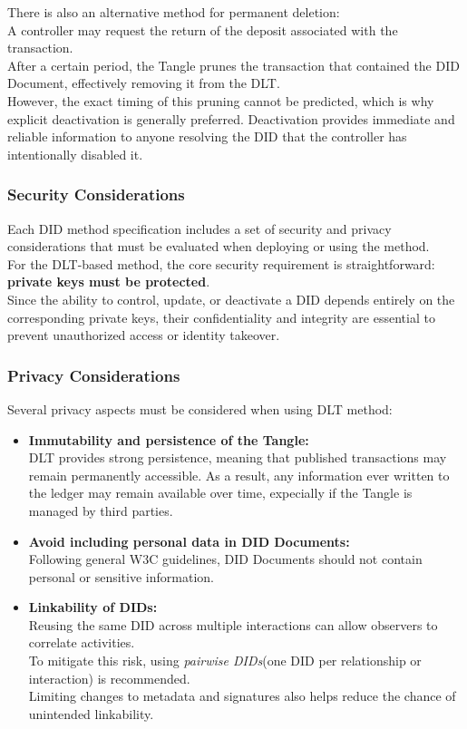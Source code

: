 \noindent
There is also an alternative method for permanent deletion: \\
A controller may request the return of the deposit associated with the transaction. \\
After a certain period, the Tangle prunes the transaction that contained the DID Document, effectively removing it from the DLT. \\
However, the exact timing of this pruning cannot be predicted, which is why explicit deactivation is generally preferred. Deactivation provides immediate and reliable information to anyone resolving the DID that the controller has intentionally disabled it.

\subsubsection *{Security Considerations}
Each DID method specification includes a set of security and privacy considerations that must be evaluated when deploying or using the method.\\ 
For the DLT-based method, the core security requirement is straightforward: \textbf{private keys must be protected}.\\
Since the ability to control, update, or deactivate a DID depends entirely on the corresponding private keys, their confidentiality and integrity are essential to prevent unauthorized access or identity takeover.

\subsubsection *{Privacy Considerations}

Several privacy aspects must be considered when using DLT method:

\begin{itemize}
    \item \textbf{Immutability and persistence of the Tangle:}\\  
    DLT provides strong persistence, meaning that published transactions may remain permanently accessible. As a result, any information ever written to the ledger may remain available over time, expecially if the Tangle is managed by third parties.\\

    \item \textbf{Avoid including personal data in DID Documents:}\\  
    Following general W3C guidelines, DID Documents should not contain personal or sensitive information.

    \item \textbf{Linkability of DIDs:}\\  
    Reusing the same DID across multiple interactions can allow observers to correlate activities.\\ To mitigate this risk, using \textit{pairwise DIDs}(one DID per relationship or interaction) is recommended.\\
    Limiting changes to metadata and signatures also helps reduce the chance of unintended linkability.
\end{itemize}

